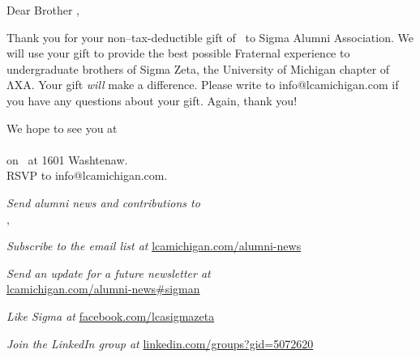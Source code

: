 \documentclass{article}
\newlength\topWindowMinY
\newlength\topWindowWidth
\newlength\topWindowHeight
\newlength\bottomWindowMinY
\newlength\bottomWindowWidth
\newlength\bottomWindowHeight
\begin{document}
\vfill

Dear Brother \donorLastName,

Thank you for your non–tax-deductible gift of \donationAmount\ to Sigma Alumni
Association. We will use your gift to provide the best possible Fraternal
experience to undergraduate brothers of Sigma Zeta, the University of Michigan
chapter of ΛΧΑ. Your gift \emph{will} make a difference. Please write to
info@lcamichigan.com if you have any questions about your gift. Again, thank
you!

\vfill

{\fontsize{14}{22}\selectfont{}
  We hope to see you at\\[8bp]
  {\sffamily\fontsize{24}{24}\selectfont{}
    \MakeUppercase{\eventName}%
  }\\
  on \eventDate\ at 1601 Washtenaw.\\
  RSVP to info@lcamichigan.com.\par
}

\vspace{0.25in}

\emph{Send alumni news and contributions to\\}
\SigmaStreet, \SigmaCityStateAndZIP

\emph{Subscribe to the email list at} \url{lcamichigan.com/alumni-news}

\emph{Send an update for a future newsletter at\\}
\url{lcamichigan.com/alumni-news#sigman}

\emph{Like Sigma at} \url{facebook.com/lcasigmazeta}

\emph{Join the LinkedIn group at} \url{linkedin.com/groups?gid=5072620}

\iffalse
\newlength\windowMinX
\windowMinX0.375in
\begin{tikzpicture}[remember picture,overlay]
  \begin{scope}[lightgray]
    \draw
      ([shift={(\windowMinX, -\topWindowMinY)}]current page.north west) rectangle
      ([shift={(\windowMinX + \topWindowWidth, -(\topWindowMinY + \topWindowHeight))}]current page.north west);
    \draw
      ([shift={(\windowMinX, -\bottomWindowMinY)}]current page.north west) rectangle
      ([shift={(\windowMinX + \bottomWindowWidth, -(\bottomWindowMinY + \bottomWindowHeight))}]current page.north west);
  \end{scope}
\end{tikzpicture}
\fi
\end{document}
